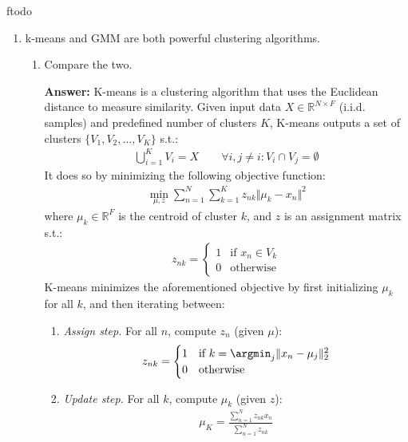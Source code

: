 ƒtodo\documentclass{article}
\newenvironment{QandA}{\begin{enumerate}[label=\arabic*.]}{\end{enumerate}}
\newenvironment{InnerQandA}{\begin{enumerate}[label=\roman*.]}{\end{enumerate}}
\newenvironment{answer}{\par\normalfont \textbf{Answer:}}{}
\newcommand{\R}{\mathbb{R}}
\begin{document}
\begin{QandA}
    \item k-means and GMM are both powerful clustering algorithms.
    \begin{InnerQandA}
        \item Compare the two.
        \begin{answer}
            K-means is a clustering algorithm that uses the Euclidean distance to measure similarity. Given input data $X \in \R^{N \times F}$ (i.i.d. samples) and predefined number of clusters $K$, K-means outputs a set of clusters $\{V_1, V_2, \ldots, V_K\}$ s.t.:
            \begin{align*}
                \bigcup_{i=1}^K V_i = X \quad\quad \forall i, j\neq i:  V_i \cap V_j = \emptyset
            \end{align*}
            It does so by minimizing the following objective function:
            \begin{align*}
                \min_{\mu, z} \sum_{n=1}^N \sum_{k=1}^K z_{nk} \Vert \mu_k - x_n \Vert^2
            \end{align*}
            where $\mu_k \in \R^{F}$ is the centroid of cluster $k$, and $z$ is an assignment matrix s.t.:
            \begin{align*}
                z_{nk} = \begin{cases}
                    1 & \text{if } x_n \in V_k \\
                    0 & \text{otherwise}
                \end{cases}
            \end{align*}
            K-means minimizes the aforementioned objective by first initializing $\mu_k$ for all $k$, and then iterating between:
            \begin{enumerate}[label=\arabic*.]
            \item \textit{Assign step.} For all $n$, compute $z_{n}$ (given $\mu$):
            \begin{align*}
                z_{nk} = \begin{cases}
                    1 &\text{if } k = \argmin_{j} \Vert x_n - \mu_j \Vert^2_2 \\
                    0 &\text{otherwise}
                \end{cases}
            \end{align*}
            \item \textit{Update step.} For all $k$, compute $\mu_k$ (given $z$):
            \begin{align*}
                \mu_K = \frac{\sum_{n=1}^N z_{nk} x_n}{\sum_{n=1}^N z_{nk}}

\end{align*}
\end{enumerate}
\end{answer}
\end{InnerQandA}
\end{QandA}
\end{document}
